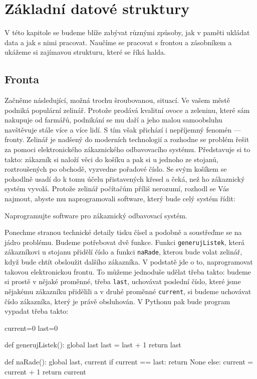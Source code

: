 \ifx\ucebnice\undefined

\setcounter{section}{1}
\fi
\section{Základní datové struktury}

V této kapitole se budeme blíže zabývat různými způsoby, jak v paměti ukládat data a jak s nimi pracovat. Naučíme se
pracovat s frontou a zásobníkem a ukážeme si zajímavou strukturu, které se říká halda.

\subsection*{Fronta}

Začněme následující, možná trochu šroubovanou, situací. Ve vašem městě podniká populární zelinář. Protože prodává kvalitní ovoce a zeleninu,
které sám nakupuje od farmářů, podnikání se mu daří a jeho malou samoobsluhu navštěvuje stále více a více lidí. S tím však
přichází i nepříjemný fenomén --- fronty. Zelinář je nadšený do moderních technologií a rozhodne se problém řešit za pomoci
elektronického zákaznického odbavovacího systému. Představuje si to takto: zákazník si naloží věci do košíku a pak si u jednoho ze stojanů,
roztroušených po obchodě, vyzvedne pořadové číslo. Se svým košíkem se pohodlně usadí do k tomu účelu přistavených
křesel a čeká, než ho zákaznický systém vyvolá. Protože zelinář počítačům příliš nerozumí, rozhodl se Vás najmout, abyste
mu naprogramovali software, který bude celý systém řídit:

\begin{question} Naprogramujte software pro zákaznický odbavovací systém.
\end{question}

Ponechme stranou technické detaily tisku čísel a podobně a soustřeďme se na jádro problému. Budeme potřebovat dvě funkce. Funkci
{\tt generujListek}, která zákazníkovi u stojanu přidělí číslo a funkci {\tt naRade}, kterou bude volat zelinář, když bude chtít
obsloužit dalšího zákazníka. V podstatě jde o to, naprogramovat takovou elektronickou frontu. To můžeme jednoduše udělat třeba
takto: budeme si prostě v nějaké proměnné, třeba {\tt last},  uchovávat poslední číslo, které jsme nějakému zákazníku přidělili a v druhé
proměnné {\tt current}, si budeme uchovávat číslo zákazníka, který je právě obsluhován. V Pythonu pak bude program vypadat třeba
takto:

\begin{python}
current=0
last=0

def generujListek():
    global last
    last = last + 1
    return last

def naRade():
    global last, current
    if current == last:
        return None
    else:
        current = current + 1
    return current
\end{python}

